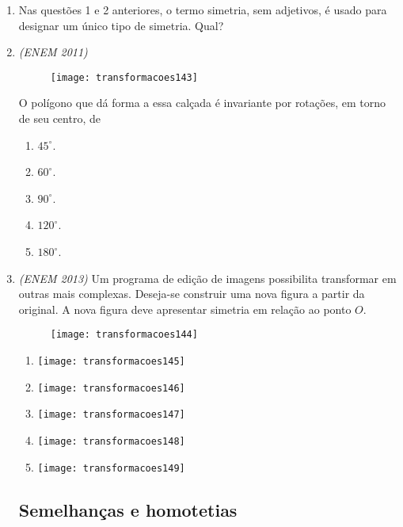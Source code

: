 \begin{enumerate}
\item Nas questões 1 e 2 anteriores, o termo simetria, sem adjetivos, é usado para designar um único tipo de simetria. Qual? 


\item \textit{(ENEM 2011)}
\begin{figure}[H]
\centering

\texttt{[image: transformacoes143]}
\end{figure}

O polígono que dá forma a essa calçada é invariante por rotações, em torno de seu centro, de
\begin{enumerate}
\item $45^{\circ}$.
\item $60^{\circ}$.
\item $90^{\circ}$.
\item $120^{\circ}$.
\item $180^{\circ}$.
\end{enumerate}

\item \textit{(ENEM 2013)} Um programa de edição de imagens possibilita transformar em outras mais complexas. Deseja-se construir uma nova figura a partir da original. A nova figura deve apresentar simetria em relação ao ponto $O$. 

\begin{figure}[H]
\centering

\texttt{[image: transformacoes144]}
\end{figure}

\begin{multicols}{2}
\begin{enumerate}
\item {}
{
\texttt{[image: transformacoes145]}
}
\item {}
{
\texttt{[image: transformacoes146]}
}
\item {}
{
\texttt{[image: transformacoes147]}
}
\item {}
{
\texttt{[image: transformacoes148]}
}
\item {}
{
\texttt{[image: transformacoes149]}
}
\end{enumerate}
\end{multicols}

\subsection{Semelhanças e homotetias}



\end{enumerate}
